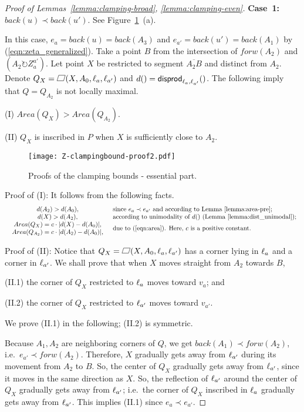 \documentclass{ws-ijcga}
\begin{document}
\begin{proof}[Proof of Lemmas~\ref{lemma:clamping-broad}, \ref{lemma:clamping-even}]
\smallskip \noindent \textbf{Case~1:} $back(u)\prec back(u')$. See Figure~\ref{fig:PC2}~(a).

In this case, $e_a=back(u)=back(A_3)$ and $e_{a'}=back(u')=back(A_1)$ by (\ref{eqn:zeta_generalized}).
Take a point $B$ from the intersection of $forw(A_2)$ and $(A_2\circlearrowright Z_a^{a'})$.
Let point $X$ be restricted to segment $\overline{A_2B}$ and distinct from $A_2$.
Denote $Q_X=\parallelogram(X,A_0,\el_a,\el_{a'})$ and $d()=\mathsf{disprod}_{\ell_{a},\ell_{a'}}()$.
The following imply that $Q=Q_{A_2}$ is not locally maximal.

(I) $Area(Q_X)>Area(Q_{A_2})$.

(II) $Q_X$ is inscribed in $P$ when $X$ is sufficiently close to $A_2$.

\begin{figure}[h]
\centering\texttt{[image: Z-clampingbound-proof2.pdf]}
\caption{Proofs of the clamping bounds - essential part.}\label{fig:PC2}
\end{figure}

\smallskip \noindent Proof of (I): It follows from the following facts.
$$
\begin{array}{cl}
  d(A_2)>d(A_0), & \hbox{since $e_a\prec e_{a'}$ and according to Lemma~\ref{lemma:area-pre};} \\
  d(X)>d(A_2), & \hbox{according to unimodality of $d()$ (Lemma~\ref{lemma:dist_unimodal});}\\
  \begin{array}{c}
     Area(Q_X)=c\cdot |d(X)-d(A_0)|,\\
     Area(Q_{A_2})=c\cdot |d(A_2)-d(A_0)|,
   \end{array} & \hbox{due to (\ref{eqn:area}). Here, $c$ is a positive constant.}
\end{array}$$

\noindent Proof of (II): Notice that $Q_X=\parallelogram(X,A_0,\el_a,\el_{a'})$ has a corner lying in $\ell_a$ and a corner in $\ell_{a'}$.
We shall prove that when $X$ moves straight from $A_2$ towards $B$,

(II.1) the corner of $Q_X$ restricted to $\ell_a$ moves toward $v_a$; and

(II.2) the corner of $Q_X$ restricted to $\ell_{a'}$ moves toward $v_{a'}$.

We prove (II.1) in the following; (II.2) is symmetric.

Because $A_1,A_2$ are neighboring corners of $Q$, we get $back(A_1)\prec forw(A_2)$, i.e.\ $e_{a'}\prec forw(A_2)$.
Therefore, $X$ gradually gets away from $\ell_{a'}$ during its movement from $A_2$ to $B$.
So, the center of $Q_X$ gradually gets away from $\ell_{a'}$, since it moves in the same direction as $X$.
So, the reflection of $\ell_{a'}$ around the center of $Q_X$ gradually gets away from $\ell_{a'}$;
i.e.\ the corner of $Q_X$ inscribed in $\ell_a$ gradually gets away from $\ell_{a'}$.
This implies (II.1) since $e_a\prec e_{a'}$.


\end{proof}
\end{document}
